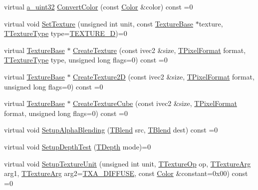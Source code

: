 \begin{DoxyCompactItemize}
virtual \hyperlink{_common_defines_8h_a964296f9770051b9e4807b1f180dd416}{a\+\_\+uint32} \hyperlink{class_agmd_1_1_driver_aa9090ef4c1fd4865a708cf990155c780}{Convert\+Color} (const \hyperlink{class_agmd_utilities_1_1_color}{Color} \&color) const =0
\item 
virtual void \hyperlink{class_agmd_1_1_driver_ae64ea2bdfb1bc1b114184d1135b613ff}{Set\+Texture} (unsigned int unit, const \hyperlink{class_agmd_1_1_texture_base}{Texture\+Base} $\ast$texture, \hyperlink{namespace_agmd_a7036bece09449a930cfec410f75e85f4}{T\+Texture\+Type} type=\hyperlink{namespace_agmd_a7036bece09449a930cfec410f75e85f4a337588dae252a993034541482655f94d}{T\+E\+X\+T\+U\+R\+E\+\_\+D})=0
\item 
virtual \hyperlink{class_agmd_1_1_texture_base}{Texture\+Base} $\ast$ \hyperlink{class_agmd_1_1_driver_ae34b1e5edc9a342fd5f1103a1188fce5}{Create\+Texture} (const ivec2 \&size, \hyperlink{namespace_agmd_afc48fd9fa5dccb4c5621c052bfd1a7ec}{T\+Pixel\+Format} format, \hyperlink{namespace_agmd_a7036bece09449a930cfec410f75e85f4}{T\+Texture\+Type} type, unsigned long flags=0) const =0
\item 
virtual \hyperlink{class_agmd_1_1_texture_base}{Texture\+Base} $\ast$ \hyperlink{class_agmd_1_1_driver_a1f3811041b6e476bf5523b51e9decaa4}{Create\+Texture2\+D} (const ivec2 \&size, \hyperlink{namespace_agmd_afc48fd9fa5dccb4c5621c052bfd1a7ec}{T\+Pixel\+Format} format, unsigned long flags=0) const =0
\item 
virtual \hyperlink{class_agmd_1_1_texture_base}{Texture\+Base} $\ast$ \hyperlink{class_agmd_1_1_driver_a86ca6eb2c7dde110c0ad0aaa3be69602}{Create\+Texture\+Cube} (const ivec2 \&size, \hyperlink{namespace_agmd_afc48fd9fa5dccb4c5621c052bfd1a7ec}{T\+Pixel\+Format} format, unsigned long flags=0) const =0
\item 
virtual void \hyperlink{class_agmd_1_1_driver_a9b028ec5fde8ac735723a49df6d69a9d}{Setup\+Alpha\+Blending} (\hyperlink{namespace_agmd_a5c64d61de9c502c3159b9ce5d653f947}{T\+Blend} src, \hyperlink{namespace_agmd_a5c64d61de9c502c3159b9ce5d653f947}{T\+Blend} dest) const =0
\item 
virtual void \hyperlink{class_agmd_1_1_driver_a431a5401de0d77261b341de358faaf0c}{Setup\+Depth\+Test} (\hyperlink{namespace_agmd_a6bf1c529fabec2b3b33d9d94a032cc6a}{T\+Depth} mode)=0
\item 
virtual void \hyperlink{class_agmd_1_1_driver_a772215047c5605c5d1d321f3f5ddac7e}{Setup\+Texture\+Unit} (unsigned int unit, \hyperlink{namespace_agmd_aafbdbe5caf9cc8574624faa1943bf5ef}{T\+Texture\+Op} op, \hyperlink{namespace_agmd_ace3617cd312c454f60b4511e3e873db5}{T\+Texture\+Arg} arg1, \hyperlink{namespace_agmd_ace3617cd312c454f60b4511e3e873db5}{T\+Texture\+Arg} arg2=\hyperlink{namespace_agmd_ace3617cd312c454f60b4511e3e873db5a3b6eaeb8bc6375565b086e228263c2ee}{T\+X\+A\+\_\+\+D\+I\+F\+F\+U\+S\+E}, const \hyperlink{class_agmd_utilities_1_1_color}{Color} \&constant=0x00) const =0

\end{DoxyCompactItemize}
